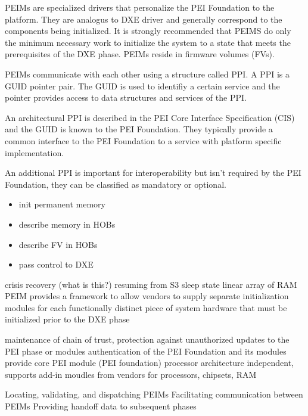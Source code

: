 \begin{enumerate}
    PEIMs are specialized drivers that personalize the PEI Foundation to the platform. They are analogus to DXE driver and generally correspond to the components being initialized. It is strongly recommended that PEIMS do only the minimum necessary work to initialize the system to a state that meets the prerequisites of the DXE phase. PEIMs reside in firmware volumes (FVs).

    PEIMs communicate with each other using a structure called PPI. A PPI is a GUID pointer pair. The GUID is used to identifiy a certain service and the pointer provides access to data structures and services of the PPI.


    An architectural PPI is described in the PEI Core Interface Specification (CIS) and the GUID is known to the PEI Foundation. They typically provide a common interface to the PEI Foundation to a service with platform specific implementation.

    An additional PPI is important for interoperability but isn't required by the PEI Foundation, they can be classified as mandatory or optional.


    \begin{itemize}
        \item init permanent memory
        \item describe memory in \acp{HOB}
        \item describe \ac{FV} in \acp{HOB}
        \item pass control to \ac{DXE}
    \end{itemize}

    crisis recovery (what is this?)
    resuming from S3 sleep state
    linear array of RAM
    \ac{PEIM} provides a framework to allow vendors to supply separate initialization modules for
    each functionally distinct piece of system hardware that must be initialized prior to the DXE phase \cite{pi-spec}

    maintenance of chain of trust, protection against unauthorized updates to the PEI phase or modules
    authentication of the PEI Foundation and its modules
    provide core PEI module (PEI foundation) processor architecture independent, supports add-in moudles from vendors for processors, chipsets, RAM

    Locating, validating, and dispatching PEIMs
    Facilitating communication between PEIMs
    Providing handoff data to subsequent phases


\end{enumerate}
